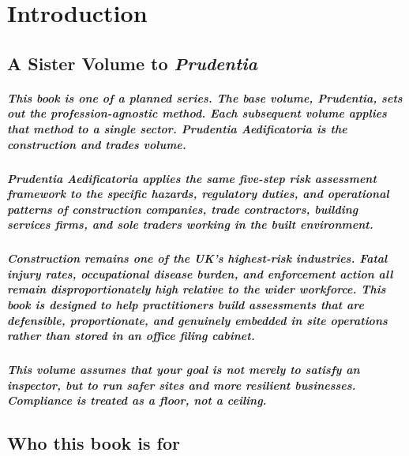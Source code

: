 \chapter{Introduction}
\label{chap:Introduction}

\section{A Sister Volume to \textit{Prudentia}}

\paragraph{This book is one of a planned series. The base volume, \textit{Prudentia}, sets out the profession-agnostic method. Each subsequent volume applies that method to a single sector. \textit{Prudentia Aedificatoria} is the construction and trades volume.}

\paragraph{\textit{Prudentia Aedificatoria} applies the same five-step risk assessment framework to the specific hazards, regulatory duties, and operational patterns of construction companies, trade contractors, building services firms, and sole traders working in the built environment.}

\paragraph{Construction remains one of the UK's highest-risk industries. Fatal injury rates, occupational disease burden, and enforcement action all remain disproportionately high relative to the wider workforce. This book is designed to help practitioners build assessments that are defensible, proportionate, and genuinely embedded in site operations rather than stored in an office filing cabinet.}

\paragraph{This volume assumes that your goal is not merely to satisfy an inspector, but to run safer sites and more resilient businesses. Compliance is treated as a floor, not a ceiling.}

\section{Who this book is for}

